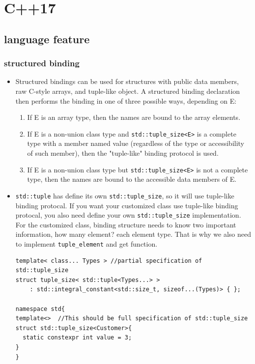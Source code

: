 \documentclass[a4paper,11pt,twoside]{book}
\begin{document}
\section{C++17}
\subsection{language feature}
\subsubsection{structured binding}
\begin{itemize}

    \item Structured bindings can be used for structures with public data members, raw C-style arrays, and tuple-like object. A structured binding declaration then performs the binding in one of three possible ways, depending on E:
        \begin{enumerate}
            \item If E is an array type, then the names are bound to the array elements.
            \item If E is a non-union class type and \texttt{std::tuple\_size<E>} is a complete type with a member named value (regardless of the type or accessibility of such member), then the "tuple-like" binding protocol is used.
            \item If E is a non-union class type but \texttt{std::tuple\_size<E>} is not a complete type, then the names are bound to the accessible data members of E.
        \end{enumerate}

    \item \texttt{std::tuple} has define its own \texttt{std::tuple\_size}, so it will use tuple-like binding protocal. If you want your customized class use tuple-like binding protocal, you also need define your own \texttt{std::tuple\_size} implementation. For the customized class, binding structure needs to know two important information, how many element? each element type. That is why we also need to implement \texttt{tuple\_element} and get function.

\begin{lstlisting}
template< class... Types > //partial specification of std::tuple_size
struct tuple_size< std::tuple<Types...> >
    : std::integral_constant<std::size_t, sizeof...(Types)> { };

namespace std{
template<>  //This should be full specification of std::tuple_size
struct std::tuple_size<Customer>{
  static constexpr int value = 3;
}
}
\end{lstlisting}


\end{itemize}
\end{document}

